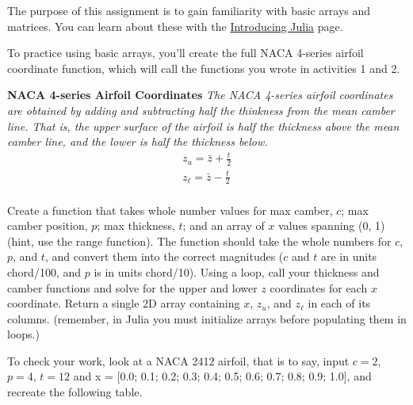 \documentclass{article}%
\begin{document}
The purpose of this assignment is to gain familiarity with basic arrays and matrices. You can learn about these with the \href{https://en.wikibooks.org/wiki/Introducing_Julia/Arrays_and_tuples}{Introducing Julia} page.

\bigskip

To practice using basic arrays, you'll create the full NACA 4-series airfoil coordinate function, which will call the functions you wrote in activities 1 and 2.

\bigskip

\begin{tcolorbox}
	\textbf{
		NACA 4-series Airfoil Coordinates}
	\textit{
		The NACA 4-series airfoil coordinates are obtained by adding and subtracting half the thinkness from the mean camber line. That is, the upper surface of the airfoil is half the thickness above the mean camber line, and the lower is half the thickness below.
	}
	\begin{align*}
	z_u = \bar{z} + \frac{t}{2}\\
	z_\ell = \bar{z} - \frac{t}{2}\\
	\end{align*}
	
\end{tcolorbox}

\bigskip

Create a function that takes whole number values for max camber, $c$; max camber position, $p$; max thickness, $t$; and an array of $x$ values spanning (0, 1) (hint, use the range function). The function should take the whole numbers for $c$, $p$, and $t$, and convert them into the correct magnitudes ($c$ and $t$ are in units chord/100, and $p$ is in units chord/10). Using a loop, call your thickness and camber functions and solve for the upper and lower $z$ coordinates for each $x$ coordinate. Return a single 2D array containing $x$, $z_u$, and $z_\ell$ in each of its columns. (remember, in Julia you must initialize arrays before populating them in loops.)

To check your work, look at a NACA 2412 airfoil, that is to say, input $c=2$, $p=4$, $t=12$ and x = [0.0; 0.1; 0.2; 0.3; 0.4; 0.5; 0.6; 0.7; 0.8; 0.9; 1.0], and recreate the following table.

\bigskip
\end{document}
